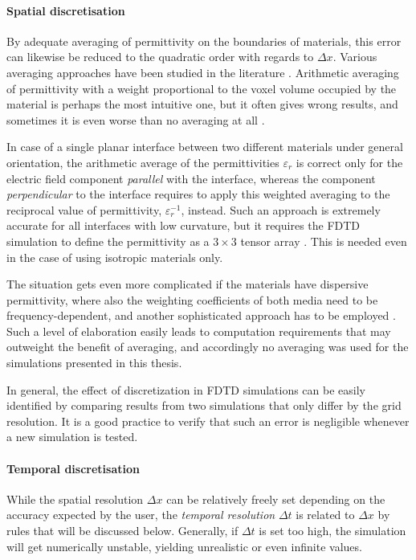 \paragraph{Spatial discretisation} %
By adequate averaging of permittivity on the boundaries of materials, this error can likewise be reduced to the quadratic order with regards to $\Delta x$. Various averaging approaches have been studied in the literature \cite{oskooi2010meep}. Arithmetic averaging of permittivity with a weight proportional to the voxel volume occupied by the material is perhaps the most intuitive one, but it often gives wrong results, and  sometimes it is even worse than no averaging at all \cite{farjadpour2006improving,deinega2007subpixel}. 

In case of a single planar interface between two different materials under general orientation, the arithmetic average of the permittivities $\varepsilon_r$ is correct only for the electric field component \textit{parallel} with the interface, whereas the component \textit{perpendicular} to the interface requires to apply this weighted averaging to the reciprocal value of permittivity, $\varepsilon_r^{-1}$, instead. Such an approach is extremely accurate for all interfaces with low curvature, but it requires the FDTD simulation to define the permittivity as a $3\times 3$ tensor array \cite{oskooi2009subpixel}. This is needed even in the case of using isotropic materials only. 

The situation gets even more complicated if the materials have dispersive permittivity, where also the weighting coefficients of both media need to be frequency-dependent, and another sophisticated approach has to be employed \cite{deinega2007subpixel,hamm2013dispersive}. Such a level of elaboration easily leads to computation requirements that may outweight the benefit of averaging, and accordingly no averaging was used for the simulations presented in this thesis. 

In general, the effect of discretization in FDTD simulations can be easily identified by comparing results from two simulations that only differ by the grid resolution. It is a good practice to verify that such an error is negligible whenever a new simulation is tested.
\paragraph{Temporal discretisation} %
While the spatial resolution $\Delta x$ can be relatively freely set depending on the accuracy expected by the user, the \textit{temporal resolution} $\Delta t$ is related to $\Delta x$ by rules that will be discussed below. Generally, if $\Delta t$ is set too high, the simulation will get numerically unstable, yielding unrealistic or even infinite values.  %

